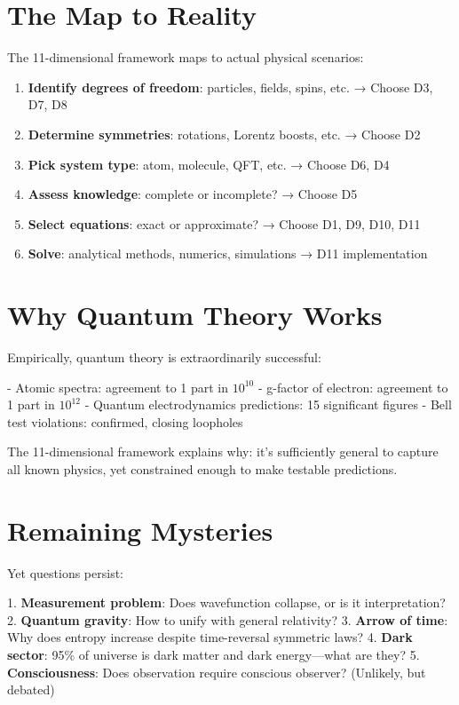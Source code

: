 \documentclass[12pt,openany,oneside]{book}
\begin{document}
{{{{{\section{The Map to Reality}

The 11-dimensional framework maps to actual physical scenarios:

\begin{enumerate}
  \item \textbf{Identify degrees of freedom}: particles, fields, spins, etc. → Choose D3, D7, D8
  \item \textbf{Determine symmetries}: rotations, Lorentz boosts, etc. → Choose D2
  \item \textbf{Pick system type}: atom, molecule, QFT, etc. → Choose D6, D4
  \item \textbf{Assess knowledge}: complete or incomplete? → Choose D5
  \item \textbf{Select equations}: exact or approximate? → Choose D1, D9, D10, D11
  \item \textbf{Solve}: analytical methods, numerics, simulations → D11 implementation
\end{enumerate}

\section{Why Quantum Theory Works}

Empirically, quantum theory is extraordinarily successful:

- Atomic spectra: agreement to 1 part in $10^{10}$
- g-factor of electron: agreement to 1 part in $10^{12}$
- Quantum electrodynamics predictions: 15 significant figures
- Bell test violations: confirmed, closing loopholes

The 11-dimensional framework explains why: it's sufficiently general to capture all known physics, yet constrained enough to make testable predictions.

\section{Remaining Mysteries}

Yet questions persist:

1. \textbf{Measurement problem}: Does wavefunction collapse, or is it interpretation?
2. \textbf{Quantum gravity}: How to unify with general relativity?
3. \textbf{Arrow of time}: Why does entropy increase despite time-reversal symmetric laws?
4. \textbf{Dark sector}: 95\% of universe is dark matter and dark energy—what are they?
5. \textbf{Consciousness}: Does observation require conscious observer? (Unlikely, but debated)

}}}}}
\end{document}
